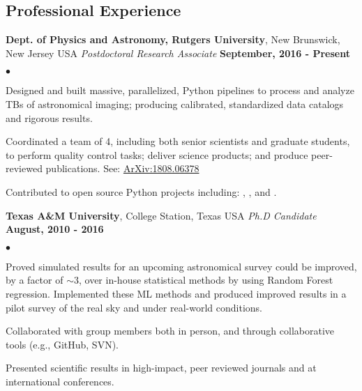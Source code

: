 \documentclass[margin,line, 11pt]{res}
\newenvironment{list2}{
  \begin{list}{$\bullet$}{%
      \setlength{\itemsep}{0in}
      \setlength{\parsep}{0in} \setlength{\parskip}{0in}
      \setlength{\topsep}{0in} \setlength{\partopsep}{0in}
      \setlength{\leftmargin}{0.2in}}}{\end{list}}
\begin{document}
\begin{resume}
\section{Professional \newline Experience}
\textbf{Dept. of Physics and Astronomy, Rutgers University}, New Brunswick, New Jersey USA \newline
\textit{Postdoctoral Research Associate} \hfill \textbf{September, 2016 - Present}\newline
    \begin{list2}
    	\vspace*{-5mm}
    	\item Designed and built massive, parallelized, Python pipelines to process and analyze TBs of astronomical imaging; producing calibrated, standardized data catalogs and rigorous results.
    	\item Coordinated a team of 4, including both senior scientists and graduate students, to perform quality control tasks; deliver science products; and produce peer-reviewed publications. See: \href{http://arxiv.org/abs/1809.06378}{ArXiv:1808.06378}
    	\item Contributed to open source Python projects including: \href{https://github.com/boada/photometrypipeline}{}, \href{http://astlib.sourceforge.net/}{}, and \href{https://github.com/boada/easyGalaxy}{}.
    \end{list2}
\vspace*{-3mm}

\textbf{Texas A\&M University}, College Station, Texas USA\newline
\textit{Ph.D Candidate} \hfill \textbf{August, 2010 - 2016}\newline
    \begin{list2}
    	\vspace*{-5mm}
      \item Proved simulated results for an upcoming astronomical survey could be improved, by a factor of $\sim3$, over in-house statistical methods by using Random Forest regression. Implemented these ML methods and produced improved results in a pilot survey of the real sky and under real-world conditions.
    	\item Collaborated with group members both in person, and through collaborative tools (e.g., GitHub, SVN).
    	\item Presented scientific results in high-impact, peer reviewed journals and at international conferences.
    \end{list2}
\vspace*{-3mm}


\end{resume}
\end{document}
